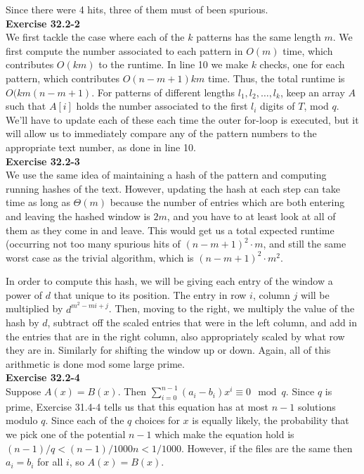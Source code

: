 \documentclass{article}
\begin{document}
Since there were 4 hits, three of them must of been spurious.\\

\noindent\textbf{Exercise 32.2-2}\\

We first tackle the case where each of the $k$ patterns has the same length $m$.  We first compute the number associated to each pattern in $O(m)$ time, which contributes $O(km)$ to the runtime.  In line 10 we make $k$ checks, one for each pattern, which contributes $O(n-m+1)km$ time.  Thus, the total runtime is $O(km(n-m+1)$. For patterns of different lengths $l_1, l_2, \ldots, l_k$, keep an array $A$ such that $A[i]$ holds the number associated to the first $l_i$ digits of $T$, mod $q$.  We'll have to update each of these each time the outer for-loop is executed, but it will allow us to immediately compare any of the pattern numbers to the appropriate text number, as done in line 10. \\

\noindent\textbf{Exercise 32.2-3}\\

We use the same idea of maintaining a hash of the pattern and computing running hashes of the text. However, updating the hash at each step can take time as long as $\Theta(m)$ because the number of entries which are both entering and leaving the hashed window is $2m$, and you have to at least look at all of them as they come in and leave. This would get us a total expected runtime (occurring not too many spurious hits of $(n-m+1)^2\cdot m$, and still the same worst case as the trivial algorithm, which is $(n-m+1)^2 \cdot m^2$.

In order to compute this hash, we will be giving each entry of the window a power of $d$ that unique to its position. The entry in row $i$, column $j$ will be multiplied by $d^{m^2 - mi + j}$. Then, moving to the right, we multiply the value of the hash by $d$, subtract off the scaled entries that were in the left column, and add in the entries that are in the right column, also appropriately scaled by what row they are in. Similarly for shifting the window up or down. Again, all of this arithmetic is done mod some large prime.\\

\noindent\textbf{Exercise 32.2-4}\\

Suppose $A(x) = B(x)$.  Then $\sum_{i=0}^{n-1}(a_i-b_i)x^i \equiv 0 \mod q$.  Since $q$ is prime, Exercise 31.4-4 tells us that this equation has at most $n-1$ solutions modulo $q$. Since each of the $q$ choices for $x$ is equally likely, the probability that we pick one of the potential $n-1$ which make the equation hold is $(n-1)/q < (n-1)/1000n < 1/1000$. However, if the files are the same then $a_i = b_i$ for all $i$, so $A(x) = B(x)$. \\
\end{document}
